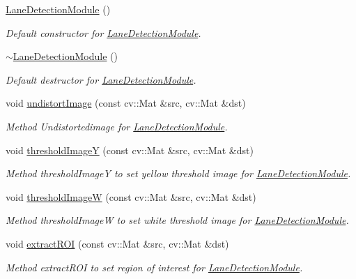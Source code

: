 \begin{DoxyCompactItemize}
\item 
\hyperlink{classLaneDetectionModule_a044d95cfc95e4dba1c96ee62c50b6df6}{Lane\+Detection\+Module} ()
\begin{DoxyCompactList}\small\item\em Default constructor for \hyperlink{classLaneDetectionModule}{Lane\+Detection\+Module}. \end{DoxyCompactList}\item 
\hyperlink{classLaneDetectionModule_abe9179d4df794c39d6fe246ad7a0d64e}{$\sim$\+Lane\+Detection\+Module} ()
\begin{DoxyCompactList}\small\item\em Default destructor for \hyperlink{classLaneDetectionModule}{Lane\+Detection\+Module}. \end{DoxyCompactList}\item 
void \hyperlink{classLaneDetectionModule_aff46b8eb6123f639c84eabb574f03241}{undistort\+Image} (const cv\+::\+Mat \&src, cv\+::\+Mat \&dst)
\begin{DoxyCompactList}\small\item\em Method Undistortedimage for \hyperlink{classLaneDetectionModule}{Lane\+Detection\+Module}. \end{DoxyCompactList}\item 
void \hyperlink{classLaneDetectionModule_aca6f7ab235dcfd5f162ee3fd876a3f8a}{threshold\+ImageY} (const cv\+::\+Mat \&src, cv\+::\+Mat \&dst)
\begin{DoxyCompactList}\small\item\em Method threshold\+ImageY to set yellow threshold image for \hyperlink{classLaneDetectionModule}{Lane\+Detection\+Module}. \end{DoxyCompactList}\item 
void \hyperlink{classLaneDetectionModule_ae3478b6b12b994fdda59573ce1b9f57f}{threshold\+ImageW} (const cv\+::\+Mat \&src, cv\+::\+Mat \&dst)
\begin{DoxyCompactList}\small\item\em Method threshold\+ImageW to set white threshold image for \hyperlink{classLaneDetectionModule}{Lane\+Detection\+Module}. \end{DoxyCompactList}\item 
void \hyperlink{classLaneDetectionModule_ad05cacb2cac52d64ee0ab295dcbcd7af}{extract\+R\+OI} (const cv\+::\+Mat \&src, cv\+::\+Mat \&dst)
\begin{DoxyCompactList}\small\item\em Method extract\+R\+OI to set region of interest for \hyperlink{classLaneDetectionModule}{Lane\+Detection\+Module}. \end{DoxyCompactList}\item 

\end{DoxyCompactItemize}

